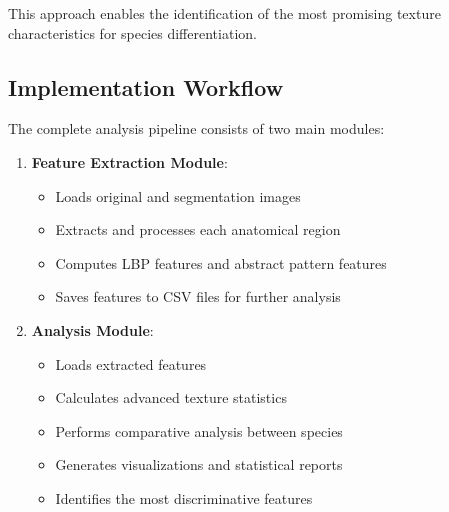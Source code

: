 \documentclass[a4paper,12pt]{report}
\begin{document}
This approach enables the identification of the most promising texture characteristics for species differentiation.





\subsection{Implementation Workflow}

The complete analysis pipeline consists of two main modules:

\begin{enumerate}
    \item \textbf{Feature Extraction Module}:
    \begin{itemize}
        \item Loads original and segmentation images
        \item Extracts and processes each anatomical region
        \item Computes LBP features and abstract pattern features
        \item Saves features to CSV files for further analysis
    \end{itemize}

    \item \textbf{Analysis Module}:
    \begin{itemize}
        \item Loads extracted features
        \item Calculates advanced texture statistics
        \item Performs comparative analysis between species
        \item Generates visualizations and statistical reports
        \item Identifies the most discriminative features
    \end{itemize}
\end{enumerate}
\end{document}

